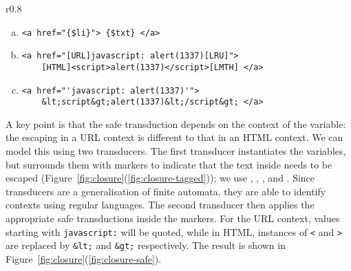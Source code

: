 \begin{wrapfigure}{r}{0.8\textwidth}
\begin{center}
    \vspace*{-6ex}
\begin{minipage}{\linewidth}
\begin{enumerate}[(a)]
\item \label{fig:closure-eg}
\begin{verbatim}
<a href="{$li}"> {$txt} </a>
\end{verbatim}
\item \label{fig:closure-tagged}
\begin{verbatim}
<a href="[URL]javascript: alert(1337)[LRU]">
    [HTML]<script>alert(1337)</script>[LMTH] </a>
\end{verbatim}
\item \label{fig:closure-safe}
\begin{verbatim}
<a href="'javascript: alert(1337)'">
    &lt;script&gt;alert(1337)&lt;/script&gt; </a>
\end{verbatim}
\end{enumerate}
\end{minipage}
\end{center}
\vspace{-3ex}
\caption{\label{fig:closure}A simple template (\ref{fig:closure-eg}) with two transduction steps (\ref{fig:closure-tagged}, \ref{fig:closure-safe}).}
\vspace{-5ex}
\end{wrapfigure}
A key point is that the safe transduction depends on the context of the variable:
the escaping in a URL context is different to that in an HTML context.
We can model this using two transducers.
The first transducer instantiates the variables, but surrounds them with markers to indicate that the text inside needs to be escaped
(Figure~\ref{fig:closure}(\ref{fig:closure-tagged}));
we use \urlstarttag, \urlendtag, \htmlstarttag, and \htmlendtag.
Since transducers are a generalisation of finite automata, they are able to identify contexts using regular languages. The second transducer then applies the appropriate safe transductions inside the markers.
For the URL context, values starting with \texttt{javascript:} will be quoted, while in HTML, instances of \texttt{<} and \texttt{>} are replaced by \texttt{\&lt;} and \texttt{\&gt;} respectively.
The result is shown in Figure~\ref{fig:closure}(\ref{fig:closure-safe}).

